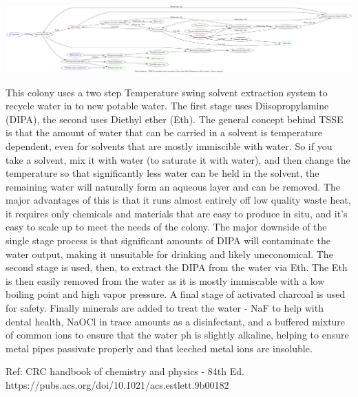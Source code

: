 \documentclass[10pt]{article}
\begin{document}
\includegraphics[width=1\textwidth]{fig_water.png}


This colony uses a two step Temperature swing solvent extraction system to recycle water in to new potable water. The first stage uses Diisopropylamine (DIPA), the second uses Diethyl ether (Eth). The general concept behind TSSE is that the amount of water that can be carried in a solvent is temperature dependent, even for solvents that are mostly immiscible with water. So if you take a solvent, mix it with water (to saturate it with water), and then change the temperature so that significantly less water can be held in the solvent, the remaining water will naturally form an aqueous layer and can be removed. The major advantages of this is that it runs almost entirely off low quality waste heat, it requires only chemicals and materials that are easy to produce in situ, and it's easy to scale up to meet the needs of the colony. The major downside of the single stage process is that significant amounts of DIPA will contaminate the water output, making it unsuitable for drinking and likely uneconomical. The second stage is used, then, to extract the DIPA from the water via Eth. The Eth is then easily removed from the water as it is mostly immiscable with a low boiling point and high vapor pressure. A final stage of activated charcoal is used for safety. Finally minerals are added to treat the water - NaF to help with dental health, NaOCl in trace amounts as a disinfectant, and a buffered mixture of common ions to ensure that the water ph is slightly alkaline, helping to ensure metal pipes passivate properly and that leeched metal ions are insoluble.

Ref: CRC handbook of chemistry and physics - 84th Ed. https://pubs.acs.org/doi/10.1021/acs.estlett.9b00182
\end{document}
